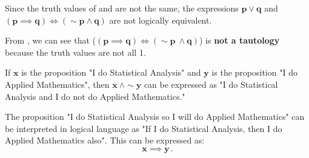 \begin{subquestions}
\begin{subsubquestions}

\subsubquestion

\begin{subsubsubquestions}
	
\subsubsubquestion

Since the truth values of  and  are not the same, the expressions $\boldsymbol{p \lor q}$ and $\boldsymbol{(p \implies q) \iff (\sim p \land q)}$ are not logically equivalent.


\subsubsubquestion

From , we can see that ($\boldsymbol{(p \implies q) \iff (\sim p ~\land q)}$) is \textbf{not a tautology} because the truth values are not all 1.

\end{subsubsubquestions}

\end{subsubquestions}


\subquestion

\begin{subsubquestions}
	
\subsubquestion

If $\boldsymbol{x}$ is the proposition "I do Statistical Analysis" and $\boldsymbol{y}$ is the proposition "I do Applied Mathematics", then $\boldsymbol{x ~\land \sim y}$ can be expressed as "I do Statistical Analysis and I do not do Applied Mathematics."

\subsubquestion

The proposition "I do Statistical Analysis so I will do Applied Mathematics" can be interpreted in logical language as "If I do Statistical Analysis, then I do Applied Mathematics also". This can be expressed as:
\begin{equation}
	\boldsymbol{x \implies y}\,.
\end{equation}

\end{subsubquestions}


\end{subquestions}

